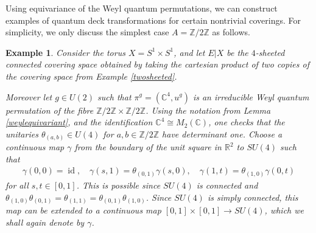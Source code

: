 \documentclass[a4paper]{amsart}
\DeclareMathOperator{\id}{id}
\numberwithin{equation}{section}
\theoremstyle{change}
\newtheorem{example}[theorem]{Example}
\begin{document}
Using equivariance of the Weyl quantum permutations, we can construct examples of quantum deck transformations for certain nontrivial coverings. For simplicity, we  only discuss the simplest case $ A = \mathbb{Z}/2\mathbb{Z} $ as follows. 

\begin{example} \label{equivariantdeckfinite}
Consider the torus $ X = S^1 \times S^1 $, and let $ E|X $ be the $ 4 $-sheeted connected covering space obtained by taking the cartesian product of two 
copies of the covering space from Example \ref{twosheeted}. 

Moreover let $ g \in U(2) $ such that $ \pi^g = (\mathbb{C}^4, u^g) $ is an irreducible Weyl quantum permutation of the fibre $ \mathbb{Z}/2\mathbb{Z} \times \mathbb{Z}/2 \mathbb{Z} $. Using the notation from Lemma \ref{weylequivariant}, and the identification $ \mathbb{C}^4 \cong M_2(\mathbb{C}) $, one checks that the unitaries $ \theta_{(a,b)} \in U(4) $ for $ a,b \in \mathbb{Z}/2 \mathbb{Z} $ have determinant one. 
Choose a continuous map $ \gamma $ from the boundary of the unit square in $ \mathbb{R}^2 $ to $ SU(4) $ such that 
\begin{align*}
\gamma(0,0) = \id, \quad \gamma(s,1) = \theta_{(0,1)} \gamma(s,0), \quad \gamma(1,t) = \theta_{(1,0)} \gamma(0,t) 
\end{align*}
for all $ s, t \in [0,1] $. This is possible since $ SU(4) $ is connected and $ \theta_{(1,0)} \theta_{(0,1)} = \theta_{(1,1)} = \theta_{(0,1)} \theta_{(1,0)} $. 
Since $ SU(4) $ is simply connected, this map can be extended to a continuous map $ [0,1] \times [0,1] \rightarrow SU(4) $, which we shall again denote by $ \gamma $. 


\end{example}
\end{document}
